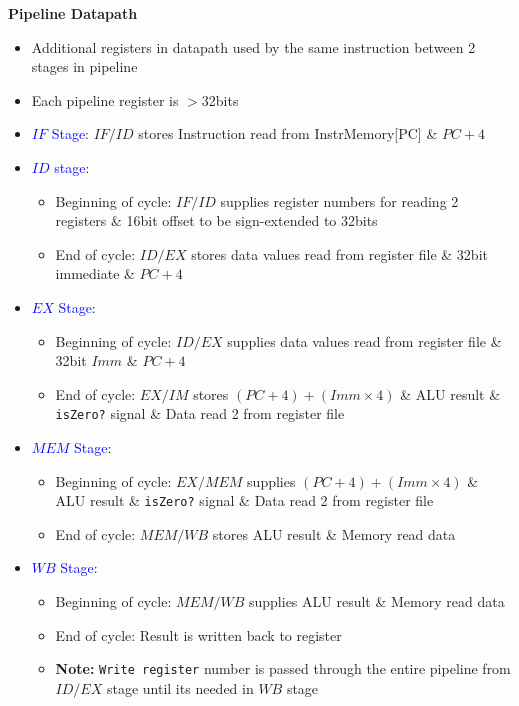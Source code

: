 \documentclass[a4paper]{article} \usepackage[backend=biber, style=numeric, sorting=none]{biblatex}
\begin{document}
\begin{multicols*}{4}
\textbf{{Pipeline Datapath}}
\begin{itemize}
\item Additional registers in datapath used by the same instruction between 2 stages in pipeline
\item Each pipeline register is $>$32bits
\item \textcolor{blue}{$IF$ Stage}: $IF/ID$ stores Instruction read from InstrMemory[PC] \& $PC + 4$
\item \textcolor{blue}{$ID$ stage}:
    \begin{itemize}
        \item Beginning of cycle: $IF/ID$ supplies register numbers for reading 2 registers \& 16bit offset to be sign-extended to 32bits
        \item End of cycle: $ID/EX$ stores data values read from register file \& 32bit immediate \& $PC+4$
    \end{itemize}
\item \textcolor{blue}{$EX$ Stage}:
\begin{itemize}
    \item Beginning of cycle: $ID/EX$ supplies data values read from register file \& 32bit $Imm$ \& $PC+4$
    \item End of cycle: $EX/IM$ stores $(PC+4)+(Imm \times 4)$ \& ALU result \& \texttt{isZero?} signal \& Data read 2 from register file
\end{itemize}
\item \textcolor{blue}{$MEM$ Stage}:
\begin{itemize}
    \item Beginning of cycle: $EX/MEM$ supplies $(PC+4)+(Imm \times 4)$ \& ALU result \& \texttt{isZero?} signal \& Data read 2 from register file
    \item End of cycle: $MEM/WB$ stores ALU result \& Memory read data
\end{itemize}
\item \textcolor{blue}{$WB$ Stage}:
\begin{itemize}
    \item Beginning of cycle: $MEM/WB$ supplies ALU result \& Memory read data
    \item End of cycle: Result is written back to register
    \item\textbf{Note:} \texttt{Write register} number is passed through the entire pipeline from $ID/EX$ stage until its needed in $WB$ stage\\
\end{itemize}
\end{itemize}

\end{multicols*}
\end{document}
